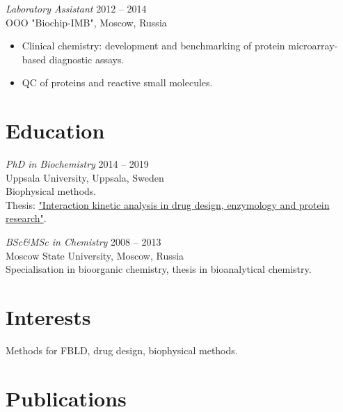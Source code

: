 \documentclass[margin]{res}
\begin{document}
\begin{resume}
{\sl Laboratory Assistant} \hfill 2012 -- 2014 \\
OOO "Biochip-IMB", Moscow, Russia
\begin{itemize}
\setlength\itemsep{0em}
\item Clinical chemistry: development and benchmarking of protein microarray-based diagnostic assays.
\item QC of proteins and reactive small molecules.
\end{itemize}
 
\section{Education} {\sl PhD in Biochemistry} \hfill 2014 -- 2019 \\
Uppsala University, Uppsala, Sweden \\
Biophysical methods. \\
Thesis: \href{http://uu.diva-portal.org/smash/record.jsf?pid=diva2%3A1256395&dswid=214}{"Interaction kinetic analysis in drug design, enzymology and protein research"}.

{\sl BSc\&MSc in Chemistry} \hfill 2008 -- 2013 \\
Moscow State University, Moscow, Russia \\
Specialisation in bioorganic chemistry, thesis in bioanalytical chemistry.
                 
\section{Interests} Methods for FBLD, drug design, biophysical methods.
 

\newpage

\section{Publications}
\nocite{*}
\printbibliography[heading=none]
\end{resume}
\end{document}
